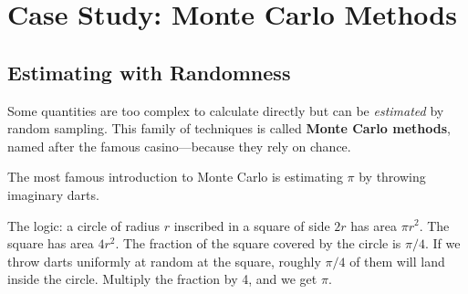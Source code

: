 \documentclass[11pt,letterpaper]{article}
\newcommand{\keyterm}[1]{\textbf{\textcolor{cssecondary}{#1}}}
\begin{document}
\section{Case Study: Monte Carlo Methods}

\subsection{Estimating with Randomness}

Some quantities are too complex to calculate directly but can be \textit{estimated} by random sampling. This family of techniques is called \keyterm{Monte Carlo methods}, named after the famous casino---because they rely on chance.

The most famous introduction to Monte Carlo is estimating $\pi$ by throwing imaginary darts.

\begin{center}
\end{center}

The logic: a circle of radius $r$ inscribed in a square of side $2r$ has area $\pi r^2$. The square has area $4r^2$. The fraction of the square covered by the circle is $\pi/4$. If we throw darts uniformly at random at the square, roughly $\pi/4$ of them will land inside the circle. Multiply the fraction by 4, and we get $\pi$.
\end{document}
